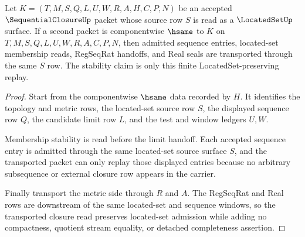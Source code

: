 \begin{theorem}
\label{thm:sequential-closure-located-set-stability}
Let $K=(T,M,S,Q,L,U,W,R,A,H,C,P,N)$ be an accepted $\SequentialClosureUp$ packet whose source row $S$ is read as a $\LocatedSetUp$ surface. If a second packet is componentwise $\hsame$ to $K$ on $T,M,S,Q,L,U,W,R,A,C,P,N$, then admitted sequence entries, located-set membership reads, RegSeqRat handoffs, and Real seals are transported through the same $S$ row. The stability claim is only this finite LocatedSet-preserving replay.
\end{theorem}
\begin{proof}
Start from the componentwise $\hsame$ data recorded by $H$. It identifies the topology and metric rows, the located-set source row $S$, the displayed sequence row $Q$, the candidate limit row $L$, and the test and window ledgers $U,W$.

Membership stability is read before the limit handoff. Each accepted sequence entry is admitted through the same located-set source surface $S$, and the transported packet can only replay those displayed entries because no arbitrary subsequence or external closure row appears in the carrier.

Finally transport the metric side through $R$ and $A$. The RegSeqRat and Real rows are downstream of the same located-set and sequence windows, so the transported closure read preserves located-set admission while adding no compactness, quotient stream equality, or detached completeness assertion.
\end{proof}

